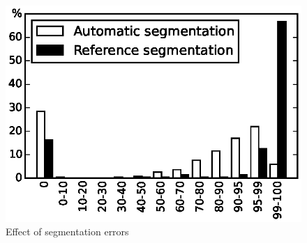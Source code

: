 \begin{figure}[t]
\centering
\includegraphics[width=0.7\linewidth]{figures/ref.eps}
\caption{Effect of segmentation errors}
\label{fig:autoVSref}
\end{figure}

